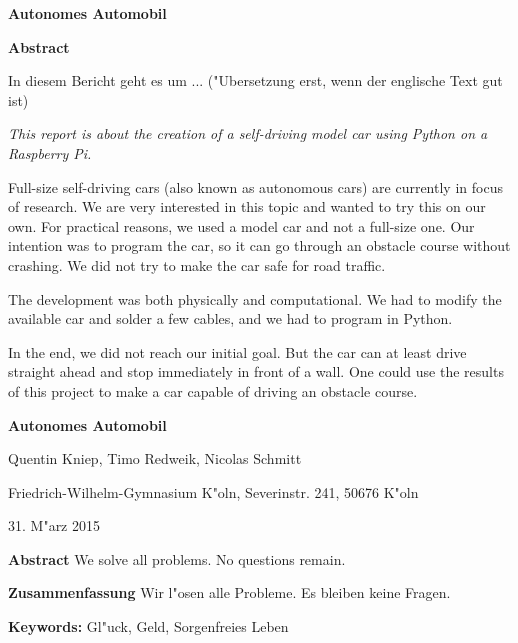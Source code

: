 \documentclass[a4paper,12pt]{article}
\begin{document}
{\Large\bf Autonomes Automobil}

\bigskip


{\bf  Abstract}

\bigskip


In diesem Bericht geht es um ... ("Ubersetzung erst, wenn der englische Text gut ist)

\medskip

{\it This report is about the creation of a self-driving model car using Python on a Raspberry Pi.}

Full-size self-driving cars (also known as autonomous cars) are currently in focus of research.
We are very interested in this topic and wanted to try this on our own.
For practical reasons, we used a model car and not a full-size one.
Our intention was to program the car, so it can go through an obstacle course without crashing.
We did not try to make the car safe for road traffic.

The development was both physically and computational.
We had to modify the available car and solder a few cables, and we had to program in Python.

In the end, we did not reach our initial goal.
But the car can at least drive straight ahead and stop immediately in front of a wall.
One could use the results of this project to make a car capable of driving an obstacle course.

\newpage


{\Large\bf Autonomes Automobil}

\medskip

Quentin Kniep, Timo Redweik, Nicolas Schmitt

\medskip

Friedrich-Wilhelm-Gymnasium K"oln, Severinstr. 241, 50676 K"oln

\medskip

31. M"arz  2015

\medskip

{\bf  Abstract}
{\small We solve all problems. No questions remain.}

\medskip

{\bf  Zusammenfassung}
{\small Wir l"osen alle Probleme. Es bleiben keine Fragen.}

\medskip

{\bf  Keywords:}
{\small Gl"uck, Geld, Sorgenfreies Leben}

\bigskip


\tableofcontents

\newpage
\end{document}
